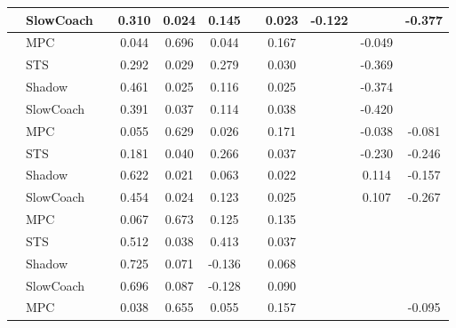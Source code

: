 \begin{tabular}{|l|l|*{9}{c|}}
                                                           & SlowCoach &       &     0.310 &     0.024 &  0.145 &     &  0.023 &  -0.122 &      &   -0.377 \\
\midrule
[False, True, True, True, False, True, False, True, False] & MPC &       &     0.044 &     0.696 &  0.044 &     &  0.167 &      &  -0.049 &       \\
                                                           & STS &       &     0.292 &     0.029 &  0.279 &     &  0.030 &      &  -0.369 &       \\
                                                           & Shadow &       &     0.461 &     0.025 &  0.116 &     &  0.025 &      &  -0.374 &       \\
                                                           & SlowCoach &       &     0.391 &     0.037 &  0.114 &     &  0.038 &      &  -0.420 &       \\
\midrule
[False, True, True, True, False, True, False, True, True] & MPC &       &     0.055 &     0.629 &  0.026 &     &  0.171 &      &  -0.038 &   -0.081 \\
                                                           & STS &       &     0.181 &     0.040 &  0.266 &     &  0.037 &      &  -0.230 &   -0.246 \\
                                                           & Shadow &       &     0.622 &     0.021 &  0.063 &     &  0.022 &      &   0.114 &   -0.157 \\
                                                           & SlowCoach &       &     0.454 &     0.024 &  0.123 &     &  0.025 &      &   0.107 &   -0.267 \\
\midrule
[False, True, True, True, False, True, False, False, False] & MPC &       &     0.067 &     0.673 &  0.125 &     &  0.135 &      &      &       \\
                                                           & STS &       &     0.512 &     0.038 &  0.413 &     &  0.037 &      &      &       \\
                                                           & Shadow &       &     0.725 &     0.071 & -0.136 &     &  0.068 &      &      &       \\
                                                           & SlowCoach &       &     0.696 &     0.087 & -0.128 &     &  0.090 &      &      &       \\
\midrule
[False, True, True, True, False, True, False, False, True] & MPC &       &     0.038 &     0.655 &  0.055 &     &  0.157 &      &      &   -0.095 \\

\end{tabular}
